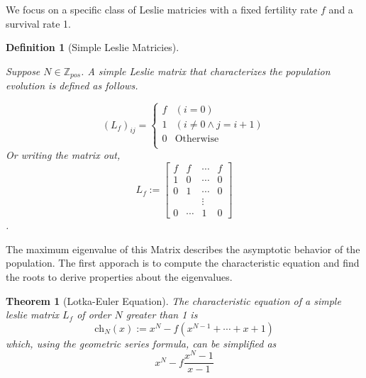 \documentclass{article}
\newtheorem{theorem}{Theorem}[section]
\newtheorem{definition}{Definition}[section]
\newtheorem{theorem}{Theorem}
\newtheorem{definition}{Definition}
\numberwithin{equation}{section}
\newcommand{\ch}{\text{ch}}
\begin{document}

We focus on a specific class of Leslie matricies with 
a fixed fertility rate $f$ and a survival rate 1. 

\begin{definition}[Simple Leslie Matricies]
    \label{LeslieDef}

    Suppose $N \in \mathbb{Z}_{pos}$. A simple Leslie matrix that 
    characterizes the population evolution is defined as follows. 

    \[
        (L_f)_{ij} = \begin{cases}
            f & (i = 0)\\
            1 & (i \neq 0 \wedge j=i+1)\\
            0 & \textrm{Otherwise}\\
        \end{cases}
    \]
        Or writing the matrix out, 
    \[L_f :=
    \begin{bmatrix}
        f & f& \cdots & f \\ 
        1 & 0 & \cdots & 0 \\
        0 & 1 & \cdots & 0\\
        &&\vdots &\\
        0 & \cdots & 1 & 0
    \end{bmatrix} 
    \]. 
\end{definition}

The maximum eigenvalue of this Matrix describes the asymptotic 
behavior of the population. The first apporach is to compute the characteristic 
equation and find the roots to derive properties about the eigenvalues. 

\begin{theorem}[Lotka-Euler Equation]
    \label{LEeq}
    The characteristic equation of a simple leslie matrix $L_f$ of 
    order $N$ greater than 1 is 
    \[
        \ch_N(x):=x^N - f(x^{N-1} + \cdots + x + 1)
    \]
    which, using the geometric series formula, can be simplified as 
    \[
        x^{N} - f \frac {x^N - 1} {x - 1}
    \]
\end{theorem}
\end{document}
